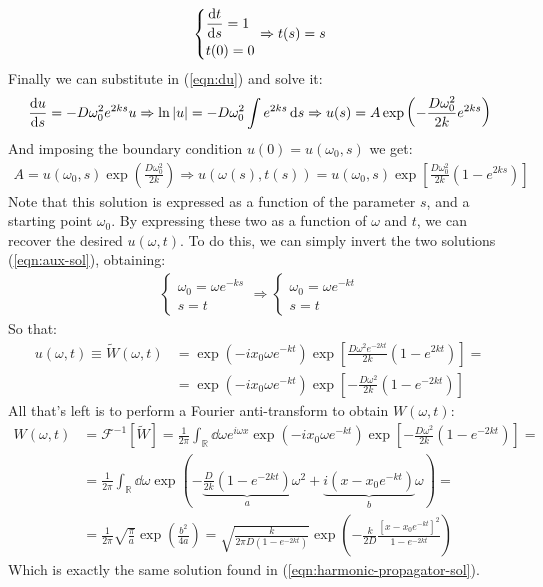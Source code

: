 \documentclass[../template.tex]{subfiles}
\begin{document}
\begin{exo}
\begin{align}
\begin{dcases}
            \dv{t}{s} = 1 \\ t(0) = 0
        \end{dcases}
    \Rightarrow t(s) = s \label{eqn:aux-sol}
    \end{align}
    Finally we can substitute in (\ref{eqn:du}) and solve it:
    \begin{align*}
        \dv{u}{s} = -D \omega_0^2 e^{2ks} u \Rightarrow \ln|u| = - D \omega_0^2 \int e^{2ks} \dd{s} \Rightarrow u(s) = A \exp\left(-\frac{D \omega_0^2}{2k} e^{2ks} \right)
    \end{align*}
    And imposing the boundary condition $u(0) = u(\omega_0, s)$ we get:
    \begin{align*}
        A = u(\omega_0,s) \exp\left(\frac{D \omega_0^2}{2k} \right) \Rightarrow u(\omega(s), t(s)) = u(\omega_0,s) \exp \left[\frac{D \omega_0^2}{2k} (1- e^{2 k s}) \right]
    \end{align*}
    Note that this solution is expressed as a function of the parameter $s$, and a starting point $\omega_0$. By expressing these two as a function of $\omega$ and $t$, we can recover the desired $u(\omega,t)$. To do this, we can simply invert the two solutions (\ref{eqn:aux-sol}), obtaining:
    \begin{align*}
        \begin{cases}
            \omega_0 = \omega e^{-ks} \\
            s = t
        \end{cases} \Rightarrow \begin{cases}
            \omega_0 = \omega e^{-kt}\\
            s = t
        \end{cases} 
    \end{align*}
    So that:
    \begin{align*}
        u(\omega,t) \equiv \tilde{W}(\omega,t) &= \exp(-i x_0 \omega e^{-kt}) \exp \left[\frac{D \omega^2 e^{-2kt}}{2k} (1-e^{2kt}) \right] =\\
        &= \exp(-i x_0 \omega e^{-kt}) \exp \left[-\frac{D \omega^2}{2k}(1-e^{-2kt}) \right]
    \end{align*}
    All that's left is to perform a Fourier anti-transform to obtain $W(\omega,t)$:
    \begin{align*}
        W(\omega,t) &= \mathcal{F}^{-1}[\tilde{W}] = \frac{1}{2\pi} \int_{\mathbb{R}} \dd{\omega} e^{i \omega x} \exp(-i x_0 \omega e^{-kt}) \exp \left[-\frac{D \omega^2}{2k}(1-e^{-2kt}) \right] =\\
        &= \frac{1}{2\pi} \int_{\mathbb{R}} \dd{\omega} \exp\left(-\underbrace{\frac{D}{2k}(1-e^{-2kt})}_{a}  \omega^2 + \underbrace{i(x-x_0 e^{-kt})}_{b} \omega \right)  =\\
        &= \frac{1}{2 \pi} \sqrt{\frac{\pi}{a} } \exp(\frac{b^2}{4a} ) = \sqrt{\frac{k}{2 \pi D (1-e^{-2kt})} } \exp\left(-\frac{k}{2D} \frac{[x-x_0 e^{-kt}]^2}{1-e^{-2kt}} \right)
    \end{align*}
    Which is exactly the same solution found in (\ref{eqn:harmonic-propagator-sol}).
\end{exo}
\end{document}
